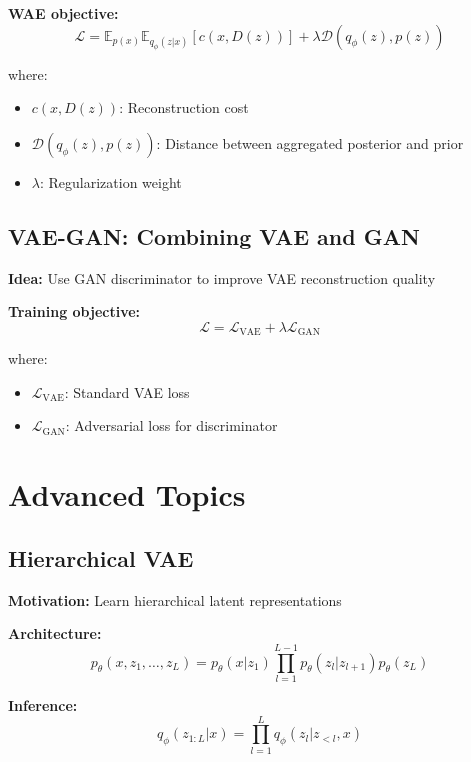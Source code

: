 \textbf{WAE objective:}
\begin{equation}
    \mathcal{L} = \mathbb{E}_{p(x)} \mathbb{E}_{q_\phi(z|x)} [c(x, D(z))] + \lambda \mathcal{D}(q_\phi(z), p(z))
\end{equation}

where:
\begin{itemize}
    \item $c(x, D(z))$: Reconstruction cost
    \item $\mathcal{D}(q_\phi(z), p(z))$: Distance between aggregated posterior and prior
    \item $\lambda$: Regularization weight
\end{itemize}

\subsection{VAE-GAN: Combining VAE and GAN}

\textbf{Idea:} Use GAN discriminator to improve VAE reconstruction quality

\textbf{Training objective:}
\begin{equation}
    \mathcal{L} = \mathcal{L}_{\text{VAE}} + \lambda \mathcal{L}_{\text{GAN}}
\end{equation}

where:
\begin{itemize}
    \item $\mathcal{L}_{\text{VAE}}$: Standard VAE loss
    \item $\mathcal{L}_{\text{GAN}}$: Adversarial loss for discriminator
\end{itemize}

\section{Advanced Topics}

\subsection{Hierarchical VAE}

\textbf{Motivation:} Learn hierarchical latent representations

\textbf{Architecture:}
\begin{equation}
    p_\theta(x, z_1, \ldots, z_L) = p_\theta(x|z_1) \prod_{l=1}^{L-1} p_\theta(z_l|z_{l+1}) p_\theta(z_L)
\end{equation}

\textbf{Inference:}
\begin{equation}
    q_\phi(z_{1:L}|x) = \prod_{l=1}^L q_\phi(z_l|z_{<l}, x)
\end{equation}

